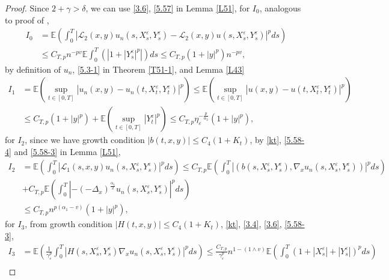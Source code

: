 \documentclass[11pt,reqno]{amsart}
\numberwithin{equation}{section}
\begin{document}
\begin{proof}
Since $2+\gamma> \delta$, we can use \eqref{3.6}, \eqref{5.57} in Lemma \ref{L51}, for $I_{0}$, analogous to proof of  \cite[Lemma 4.2]{RX},
\begin{equation}\label{5.49-1}
	\begin{split}
		I_{0}&=\mathbb{E}\left(  \int_{0}^{T}\left|\mathcal{L}_{2}(x,y)u_{n}(s,X_{s}^{\varepsilon},Y_{s}^{\varepsilon})-\mathcal{L}_{2}(x,y)u(s,X_{s}^{\varepsilon},Y_{s}^{\varepsilon})\right|^{p}ds \right)\\
		&\leq  C_{T,p}n^{-pv}\mathbb{E}\int_{0}^{T}(\left|1+|Y_{s}^{\varepsilon}|^{p}\right|)ds\leq C_{T,p}(1+|y|^{p})n^{-pv},
	\end{split}
\end{equation}
by definition of $u_{n}$, \eqref{5.3-1} in Theorem \ref{T51-1}, and Lemma \ref{L43}
\begin{equation}\label{5.49}
	\begin{split}
		I_{1}&=\mathbb{E}\left( \sup_{t\in [0,T]}|u_{n}(x,y)-u_{n}(t,X_{t}^{\varepsilon},Y_{t}^{\varepsilon})|^{p}\right)\leq \mathbb{E}\left( \sup_{t\in [0,T]}|u(x,y)-u(t,X_{t}^{\varepsilon},Y_{t}^{\varepsilon})|^{p}\right) \\
		&\leq C_{T,p}(1+|y|^{p})+\mathbb{E}\left( \sup_{t\in [0,T]}|Y_{t}^{\varepsilon}|^{p}\right)
	\leq C_{T,p}\eta_{\varepsilon}^{-\frac{p}{\alpha_{2}}}(1+|y|^{p}),
	\end{split}
\end{equation}
for $I_{2}$,  since we have growth condition $|b(t,x,y)| \leq C_{4}(1+K_{t})$, by \eqref{kt}, \eqref{5.58-4} and \eqref{5.58-3} in Lemma \ref{L51},
\begin{equation}\label{5.50}
	\begin{split}
	I_{2}&=\mathbb{E}\left(\int_{0}^{T}|\mathcal{L}_{1}(s,x,y)u_{n}(s,X_{s}^{\varepsilon},Y_{s}^{\varepsilon})|^{p}ds\right)\leq C_{T,p}  \mathbb{E}\left( \int_{0}^{T}|(b(s,X_{s}^{\varepsilon},Y_{s}^{\varepsilon}),\nabla_{x}u_{n}(s,X_{s}^{\varepsilon},Y_{s}^{\varepsilon}))|^{p}ds\right)	\\
	&+ C_{T,p} \mathbb{E}\left(\int_{0}^{T}|-(-\Delta_{x})^{\frac{\alpha_{1}}{2}}u_{n}(s,X_{s}^{\varepsilon},Y_{s}^{\varepsilon})|^{p}ds\right)\\
	&\leq C_{T,p}n^{p(\alpha_{1}-v)}(1+|y|^{p}),
	\end{split}
\end{equation}
for  $I_{3}$, from growth condition $|H(t,x,y)| \leq C_{4}(1+K_{t})$, \eqref{kt}, \eqref{3.4}, \eqref{3.6}, \eqref{5.58-3},
\begin{align}
		I_{3}&=\mathbb{E}\left(\frac{1}{\gamma_{\varepsilon}^{p}}\int_{0}^{T}|H(s,X_{s}^{\varepsilon},Y_{s}^{\varepsilon})\nabla_{x}u_{n}(s,X_{s}^{\varepsilon},Y_{s}^{\varepsilon})|^{p}ds\right)\leq  \frac{C_{T,p}}{\gamma_{\varepsilon}^{p}}n^{1-(1\wedge v)}  \mathbb{E}\left(\int_{0}^{T}\left( 1+|X_{s}^{\varepsilon}|+|Y_{s}^{\varepsilon}|\right)^{p}ds\right)\nonumber\\

\end{align}
\end{proof}
\end{document}
